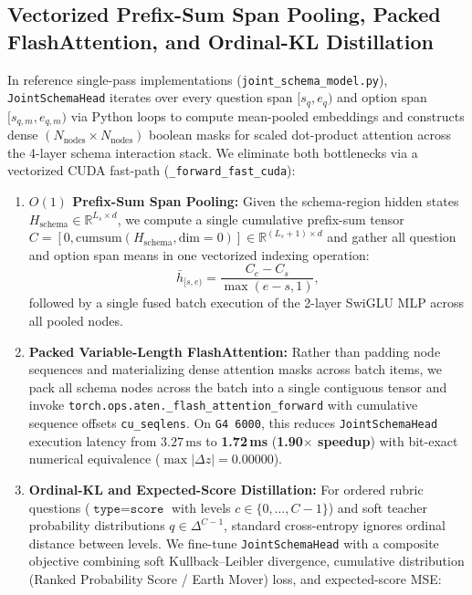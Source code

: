 \documentclass[10pt,twocolumn]{article}
\begin{document}
\subsection{Vectorized Prefix-Sum Span Pooling, Packed FlashAttention, and Ordinal-KL Distillation}
\label{sec:fast_head_ordinal}
In reference single-pass implementations (\texttt{joint\_schema\_model.py}), \texttt{JointSchemaHead} iterates over every question span $[s_q, e_q)$ and option span $[s_{q,m}, e_{q,m})$ via Python loops to compute mean-pooled embeddings and constructs dense $(N_{\text{nodes}} \times N_{\text{nodes}})$ boolean masks for scaled dot-product attention across the 4-layer schema interaction stack. We eliminate both bottlenecks via a vectorized CUDA fast-path (\texttt{\_forward\_fast\_cuda}):
\begin{enumerate}
    \item \textbf{$O(1)$ Prefix-Sum Span Pooling:} Given the schema-region hidden states $H_{\text{schema}} \in \mathbb{R}^{L_s \times d}$, we compute a single cumulative prefix-sum tensor $C = [0, \text{cumsum}(H_{\text{schema}}, \text{dim}=0)] \in \mathbb{R}^{(L_s + 1) \times d}$ and gather all question and option span means in one vectorized indexing operation:
    \begin{equation}
        \bar{h}_{[s, e)} = \frac{C_e - C_s}{\max(e - s, 1)},
    \end{equation}
    followed by a single fused batch execution of the 2-layer SwiGLU MLP across all pooled nodes.
    \item \textbf{Packed Variable-Length FlashAttention:} Rather than padding node sequences and materializing dense attention masks across batch items, we pack all schema nodes across the batch into a single contiguous tensor and invoke \texttt{torch.ops.aten.\_flash\_attention\_forward} with cumulative sequence offsets \texttt{cu\_seqlens}. On \texttt{G4 6000}, this reduces \texttt{JointSchemaHead} execution latency from $3.27\,\text{ms}$ to \textbf{1.72\,ms} (\textbf{1.90$\times$ speedup}) with bit-exact numerical equivalence ($\max |\Delta z| = 0.00000$).
    \item \textbf{Ordinal-KL and Expected-Score Distillation:} For ordered rubric questions ($\texttt{type} = \texttt{score}$ with levels $c \in \{0, \dots, C-1\}$) and soft teacher probability distributions $q \in \Delta^{C-1}$, standard cross-entropy ignores ordinal distance between levels. We fine-tune \texttt{JointSchemaHead} with a composite objective combining soft Kullback--Leibler divergence, cumulative distribution (Ranked Probability Score / Earth Mover) loss, and expected-score MSE:

\end{enumerate}
\end{document}
